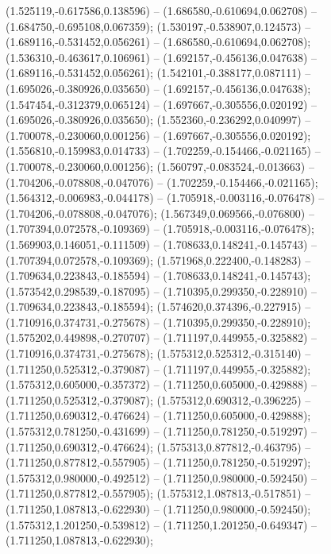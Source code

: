  (1.525119,-0.617586,0.138596) -- (1.686580,-0.610694,0.062708) -- (1.684750,-0.695108,0.067359);
 (1.530197,-0.538907,0.124573) -- (1.689116,-0.531452,0.056261) -- (1.686580,-0.610694,0.062708);
 (1.536310,-0.463617,0.106961) -- (1.692157,-0.456136,0.047638) -- (1.689116,-0.531452,0.056261);
 (1.542101,-0.388177,0.087111) -- (1.695026,-0.380926,0.035650) -- (1.692157,-0.456136,0.047638);
 (1.547454,-0.312379,0.065124) -- (1.697667,-0.305556,0.020192) -- (1.695026,-0.380926,0.035650);
 (1.552360,-0.236292,0.040997) -- (1.700078,-0.230060,0.001256) -- (1.697667,-0.305556,0.020192);
 (1.556810,-0.159983,0.014733) -- (1.702259,-0.154466,-0.021165) -- (1.700078,-0.230060,0.001256);
 (1.560797,-0.083524,-0.013663) -- (1.704206,-0.078808,-0.047076) -- (1.702259,-0.154466,-0.021165);
 (1.564312,-0.006983,-0.044178) -- (1.705918,-0.003116,-0.076478) -- (1.704206,-0.078808,-0.047076);
 (1.567349,0.069566,-0.076800) -- (1.707394,0.072578,-0.109369) -- (1.705918,-0.003116,-0.076478);
 (1.569903,0.146051,-0.111509) -- (1.708633,0.148241,-0.145743) -- (1.707394,0.072578,-0.109369);
 (1.571968,0.222400,-0.148283) -- (1.709634,0.223843,-0.185594) -- (1.708633,0.148241,-0.145743);
 (1.573542,0.298539,-0.187095) -- (1.710395,0.299350,-0.228910) -- (1.709634,0.223843,-0.185594);
 (1.574620,0.374396,-0.227915) -- (1.710916,0.374731,-0.275678) -- (1.710395,0.299350,-0.228910);
 (1.575202,0.449898,-0.270707) -- (1.711197,0.449955,-0.325882) -- (1.710916,0.374731,-0.275678);
 (1.575312,0.525312,-0.315140) -- (1.711250,0.525312,-0.379087) -- (1.711197,0.449955,-0.325882);
 (1.575312,0.605000,-0.357372) -- (1.711250,0.605000,-0.429888) -- (1.711250,0.525312,-0.379087);
 (1.575312,0.690312,-0.396225) -- (1.711250,0.690312,-0.476624) -- (1.711250,0.605000,-0.429888);
 (1.575312,0.781250,-0.431699) -- (1.711250,0.781250,-0.519297) -- (1.711250,0.690312,-0.476624);
 (1.575313,0.877812,-0.463795) -- (1.711250,0.877812,-0.557905) -- (1.711250,0.781250,-0.519297);
 (1.575312,0.980000,-0.492512) -- (1.711250,0.980000,-0.592450) -- (1.711250,0.877812,-0.557905);
 (1.575312,1.087813,-0.517851) -- (1.711250,1.087813,-0.622930) -- (1.711250,0.980000,-0.592450);
 (1.575312,1.201250,-0.539812) -- (1.711250,1.201250,-0.649347) -- (1.711250,1.087813,-0.622930);

